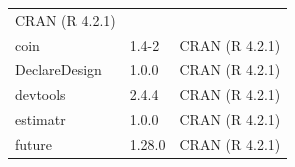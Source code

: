 \documentclass[
  12pt,
]{book}
\theoremstyle{definition}
\theoremstyle{definition}
\theoremstyle{definition}
\theoremstyle{remark}
\begin{document}
\begin{longtable}[]{@{}lll@{}}
\begin{minipage}[t]{0.69\columnwidth}
CRAN (R 4.2.1)\strut
\end{minipage}\tabularnewline
\begin{minipage}[t]{0.14\columnwidth}\raggedright
coin\strut
\end{minipage} & \begin{minipage}[t]{0.08\columnwidth}\raggedright
1.4-2\strut
\end{minipage} & \begin{minipage}[t]{0.69\columnwidth}\raggedright
CRAN (R 4.2.1)\strut
\end{minipage}\tabularnewline
\begin{minipage}[t]{0.14\columnwidth}\raggedright
DeclareDesign\strut
\end{minipage} & \begin{minipage}[t]{0.08\columnwidth}\raggedright
1.0.0\strut
\end{minipage} & \begin{minipage}[t]{0.69\columnwidth}\raggedright
CRAN (R 4.2.1)\strut
\end{minipage}\tabularnewline
\begin{minipage}[t]{0.14\columnwidth}\raggedright
devtools\strut
\end{minipage} & \begin{minipage}[t]{0.08\columnwidth}\raggedright
2.4.4\strut
\end{minipage} & \begin{minipage}[t]{0.69\columnwidth}\raggedright
CRAN (R 4.2.1)\strut
\end{minipage}\tabularnewline
\begin{minipage}[t]{0.14\columnwidth}\raggedright
estimatr\strut
\end{minipage} & \begin{minipage}[t]{0.08\columnwidth}\raggedright
1.0.0\strut
\end{minipage} & \begin{minipage}[t]{0.69\columnwidth}\raggedright
CRAN (R 4.2.1)\strut
\end{minipage}\tabularnewline
\begin{minipage}[t]{0.14\columnwidth}\raggedright
future\strut
\end{minipage} & \begin{minipage}[t]{0.08\columnwidth}\raggedright
1.28.0\strut
\end{minipage} & \begin{minipage}[t]{0.69\columnwidth}\raggedright
CRAN (R 4.2.1)\strut
\end{minipage}\tabularnewline

\end{longtable}
\end{document}
